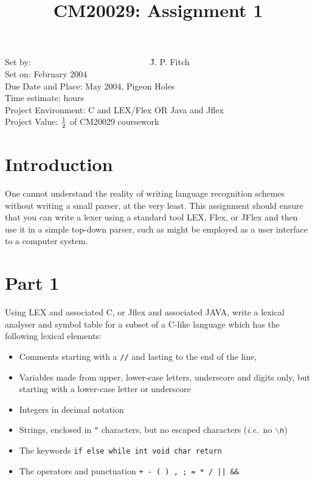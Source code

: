 
\title{ \large \bf CM20029: Assignment 1}
\author{}
\date{}
\maketitle
\setlength{\parskip}{0.2in}

\vskip -1in

\begin{tabbing}
Set by:\ \ \ \ \ \ \ \ \ \ \ \ \ \ \ \ \ \ \ \ \ \ \ \ \ \ \ \ \= J. P. Fitch \\
Set on:                         February 2004           \\
Due Date and Place:             May 2004, Pigeon Holes \\
Time estimate:                  hours                  \\
Project Environment:           \> C and LEX/Flex OR Java and Jflex      \\
Project Value:                 \> ${1 \over 2}$ of CM20029 coursework
\end{tabbing}

\section*{Introduction}

One cannot understand the reality of writing language recognition
schemes without writing a small parser, at the very least.  This
assignment should ensure that you can write a lexer using a standard
tool LEX, Flex, or JFlex and then use it in a simple top-down parser,
such as might be employed as a user interface to a computer system.

\section*{Part 1}

\noindent Using LEX and associated C, or Jflex and associated JAVA,
write a lexical analyser and symbol table for a subset of a C-like
language which has the following lexical elements: 

\begin{itemize}
\item Comments starting with a {\tt //} and lasting to the end of the
line, 
\item Variables made from upper, lower-case letters, underscore and digits only,
but starting with a lower-case letter or underscore
\item Integers in decimal notation
\item Strings, enclosed in {\tt "} characters, but no escaped
characters ({\em i.e.}~no {\tt $\backslash$n})
\item The keywords {\tt if else while int void char return}
\item The operators and punctuation {\tt + - ( ) , ; = * / || \&\& }
\end{itemize}

